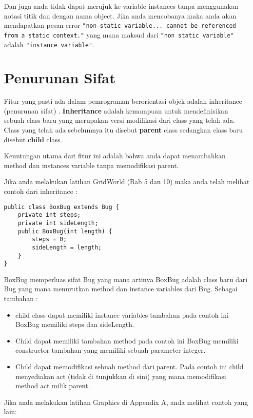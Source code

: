 Dan juga anda tidak dapat merujuk ke variable instances tanpa menggunakan notasi titik dan dengan nama object. Jika anda mencobanya maka anda akan mendapatkan pesan error \texttt{"non-static variable... cannot be referenced from a static context."} yang mana maksud dari \texttt{"non static variable"} adalah \texttt{"instance variable"}.

\section{Penurunan Sifat} %

Fitur yang pasti ada dalam pemrograman berorientasi objek adalah inheritance (penurunan sifat) . \textbf{Inheritance} adalah kemampuan untuk mendefinisikan sebuah class baru yang merupakan versi modifikasi dari class yang telah ada. Class yang telah ada sebelumnya itu disebut \textbf{parent} class sedangkan class baru disebut \textbf{child} class. 

Keuntungan utama dari fitur ini adalah bahwa anda dapat menambahkan method dan instances variable tanpa memodifikasi parent. 

Jika anda melakukan latihan GridWorld (Bab 5 dan 10) maka anda telah melihat contoh dari inheritance :

\begin{lstlisting}
public class BoxBug extends Bug {
	private int steps;
	private int sideLength;
	public BoxBug(int length) {
		steps = 0;
		sideLength = length;
	}
}
\end{lstlisting}

BoxBug memperluas sifat Bug yang mana artinya BoxBug adalah class baru dari Bug yang mana menurutkan method dan instance variables dari Bug. Sebagai tambahan :

\begin{itemize}
	\item{child class dapat memiliki instance variables tambahan pada contoh ini BoxBug memiliki steps dan sideLength. }
	\item{Child dapat memiliki tambahan method pada contoh ini BoxBug memiliki constructor tambahan yang memiliki sebuah parameter integer.}
	\item{Child dapat memodifikasi sebuah method dari parent. Pada contoh ini child menyediakan act (tidak di tunjukkan di sini) yang mana memodifikasi method act milik parent.}
\end{itemize}

Jika anda melakukan latihan Graphics di Appendix A, anda melihat contoh yang lain:

